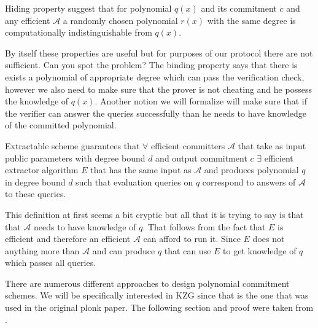 \begin{definition}{Hiding property}
    suggest that for polynomial $q(x)$ and its commitment $c$ and any efficient $\mathcal{A}$ a randomly chosen polynomial $r(x)$ with the same degree is computationally indistinguishable from $q(x)$.
\end{definition}

By itself these properties are useful but for purposes of our protocol there are not sufficient. Can you spot the problem? The binding property says that there is exists a polynomial of appropriate degree which can pass the verification check, however we also need to make sure that the prover is not cheating and he possess the knowledge of $q(x)$. Another notion we will formalize will make sure that if the verifier can answer the queries successfully than he needs to have knowledge of the committed polynomial.

\begin{definition}{Extractable scheme}
    guarantees that $\forall$ efficient committers $\mathcal{A}$ that take as input public parameters with degree bound $d$ and output commitment $c$ $\exists$ efficient extractor algorithm $E$ that has the same input as $\mathcal{A}$ and produces polynomial $q$ in degree bound $d$ such that evaluation queries on $q$ correspond to answers of $\mathcal{A}$ to these queries.
\end{definition}

This definition at first seems a bit cryptic but all that it is trying to say is that that $\mathcal{A}$ needs to have knowledge of $q$. That follows from the fact that $E$ is efficient and therefore an efficient $\mathcal{A}$ can afford to run it. Since $E$ does not anything more than $\mathcal{A}$ and can produce $q$ that can use $E$ to get knowledge of $q$ which passes all queries.

There are numerous different approaches to design polynomial commitment schemes. We will be specifically interested in KZG since that is the one that was used in the original plonk paper. The following section and proof were taken from \cite{ProofArgsAndZk}. 

